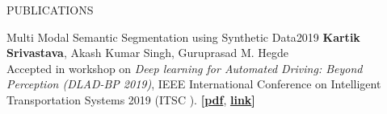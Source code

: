 \documentclass{resume} %
\begin{document}



\begin{rSection}{PUBLICATIONS}

\begin{rSubsection}{Multi Modal Semantic Segmentation using Synthetic Data}{2019}
{\textbf{Kartik Srivastava}, Akash Kumar Singh, Guruprasad M. Hegde}{}
\\{Accepted in workshop on \textit{Deep learning for Automated Driving: Beyond Perception (DLAD-BP 2019)}, IEEE International Conference on Intelligent Transportation Systems 2019 (ITSC ). \textbf{[}\href{https://arxiv.org/abs/1910.13676}{\textbf{pdf}}, \href{https://sites.google.com/view/dlad-bp-itsc2019/schedule?authuser=0\#h.p_gI84BCoB0_bJ}{\textbf{link}}\textbf{]}} 
 
\end{rSubsection} 
\end{rSection} 

\end{document}
